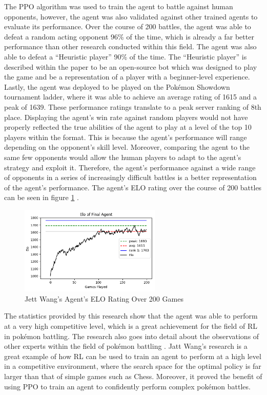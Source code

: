 The PPO algorithm was used to train the agent to battle against human opponents, however, the agent was also validated against other trained agents to evaluate its performance. Over the course of 200 battles, the agent was able to defeat a random acting opponent 96\% of the time, which is already a far better performance than other research conducted within this field. The agent was also able to defeat a ``Heuristic player'' 90\% of the time. The ``Heuristic player'' is described within the paper to be an open-source bot which was designed to play the game and be a representation of a player with a beginner-level experience. Lastly, the agent was deployed to be played on the Pokémon Showdown tournament ladder, where it was able to achieve an average rating of 1615 and a peak of 1639. These performance ratings translate to a peak server ranking of 8th place. Displaying the agent's win rate against random players would not have properly reflected the true abilities of the agent to play at a level of the top 10 players within the format. This is because the agent's performance will range depending on the opponent's skill level. Moreover, comparing the agent to the same few opponents would allow the human players to adapt to the agent's strategy and exploit it. Therefore, the agent's performance against a wide range of opponents in a series of increasingly difficult battles is a better representation of the agent's performance. The agent's ELO rating over the course of 200 battles can be seen in figure \ref{fig:agent_elo} \cite{wang2020winning}.

\begin{figure}[H]
    \centering
    \includegraphics[width=0.6\textwidth]{figures/literature_elo.png}
    \caption{Jett Wang's Agent's ELO Rating Over 200 Games}
    \label{fig:agent_elo}
\end{figure}

The statistics provided by this research show that the agent was able to perform at a very high competitive level, which is a great achievement for the field of RL in pokémon battling. The research also goes into detail about the observations of other experts within the field of pokémon battling \cite{wang2020winning}. Jatt Wang's research is a great example of how RL can be used to train an agent to perform at a high level in a competitive environment, where the search space for the optimal policy is far larger than that of simple games such as Chess. Moreover, it proved the benefit of using PPO to train an agent to confidently perform complex pokémon battles. 

